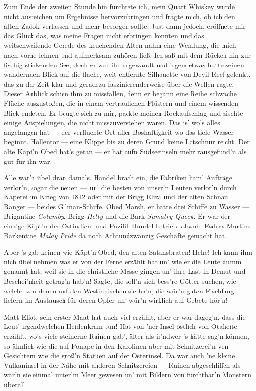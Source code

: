 Zum Ende der zweiten Stunde hin fürchtete ich, mein Quart Whiskey würde nicht ausreichen um Ergebnisse hervorzubringen und fragte mich, ob ich den alten Zadok verlassen und mehr besorgen sollte. Just dann jedoch, eröffnete mir das Glück das, was meine Fragen nicht erbringen konnten und das weitschweifende Gerede des keuchenden Alten nahm eine Wendung, die mich nach vorne lehnen und aufmerksam zuhören ließ. Ich saß mit dem Rücken hin zur fischig stinkenden See, doch er war ihr zugewandt und irgendetwas hatte seinen wandernden Blick auf die flache, weit entfernte Silhouette von Devil Reef gelenkt, das zu der Zeit klar und geradezu faszinierenderweise über die Wellen ragte. Dieser Anblick schien ihm zu missfallen, denn er begann eine Reihe schwache Flüche auszustoßen, die in einem vertraulichen Flüstern und einem wissenden Blick endeten. Er beugte sich zu mir, packte meinen Rockaufschlag und zischte einige Anspielungen, die nicht misszuverstehen waren.
\glqq Das is' wo's alles angefangen hat --- der verfluchte Ort aller Boshaftigkeit wo das tiefe Wasser beginnt. Höllentor --- eine Klippe bis zu deren Grund keine Lotschnur reicht. Der alte Käpt'n Obed hat's getan --- er hat aufn Südseeinseln mehr rausgefund'n als gut für ihn war.

Alle war'n übel dran damals. Handel brach ein, die Fabriken ham' Aufträge verlor'n, sogar die neuen --- un' die besten von unser'n Leuten verlor'n durch Kaperei im Krieg von 1812 oder mit der Brigg Eliza und der alten Schnau Ranger --- beides Gilman-Schiffe. Obed Marsh, er hatte drei Schiffe zu Wasser --- Brigantine \textit{Columby}, Brigg \textit{Hetty} und die Bark \textit{Sumatry Queen}. Er war der einz'ge Käpt'n der Ostindien- und Pazifik-Handel betrieb, obwohl Esdras Martins Barkentine \textit{Malay Pride} da noch Achtundzwanzig Geschäfte gemacht hat.

Aber 's gab keinen wie Käpt'n Obed, den alten Satansbraten! Hehe! Ich kann ihm nich übel nehmen was er von der Ferne erzählt hat un' wie er die Leute dumm genannt hat, weil sie in die christliche Messe gingen un' ihre Last in Demut und Beschei'nheit getrag'n hab'n! Sagte, die soll'n sich bess're Götter suchen, wie welche von denen auf den Westinnischen sie ha'n, die wür'n guten Fischfang liefern im Austausch für deren Opfer un' wür'n wirklich auf Gebete hör'n!

Matt Eliot, sein erster Maat hat auch viel erzählt, aber er war dageg'n, dass die Leut' irgendwelchen Heidenkram tun! Hat von 'ner Insel östlich von Otaheite erzählt, wo's viele steinerne Ruinen gab', älter als ir'ndwer 's hätte sag'n können, so ähnlich wie die auf Ponape in den Karolinen aber mit Schnitzerei'n von Gesichtern wie die groß'n Statuen auf der Osterinsel. Da war auch 'ne kleine Vulkaninsel in der Nähe mit anderen Schnitzereien --- Ruinen abgeschliffen als wär'n sie einmal unter'm Meer gewesen un' mit Bildern von furchtbar'n Monstern überall.

